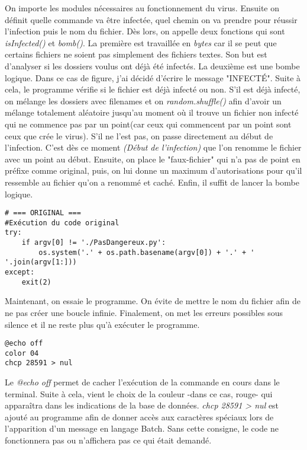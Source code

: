 On importe les modules nécessaires au fonctionnement du virus. Ensuite on définit quelle commande va être infectée, quel chemin on va prendre pour réussir l'infection puis le nom du fichier.
\medskip
Dès lors, on appelle deux fonctions qui sont \textit{isInfected()} et \textit{bomb()}. La première est travaillée en \textit{bytes} car il se peut que certains fichiers ne soient pas simplement des fichiers textes. Son but est d'analyser si les dossiers voulus ont déjà été infectés.
La deuxième est une bombe logique. Dans ce cas de figure, j'ai décidé d'écrire le message "INFECTÉ".
Suite à cela, le programme vérifie si le fichier est déjà infecté ou non. S'il est déjà infecté, on mélange les dossiers avec filenames et on \textit{random.shuffle()} afin d'avoir un mélange totalement aléatoire jusqu'au moment où il trouve un fichier non infecté qui ne commence pas par un point(car ceux qui commencent par un point sont ceux que crée le virus).  S'il ne l'est pas, on passe directement au début de l'infection. 
C'est dès ce moment \textit{(Début de l'infection)} que l'on renomme le fichier avec un point au début. Ensuite, on place le "faux-fichier" qui n'a pas de point en préfixe comme original, puis, on lui donne un maximum d'autorisations pour qu'il ressemble au fichier qu'on a renommé et caché. Enfin, il suffit de lancer la bombe logique.


\begin{lstlisting}[caption={Virus Raspberry PI suite},label={listing:Python}]
# === ORIGINAL ===
#Exécution du code original
try:
    if argv[0] != './PasDangereux.py':
        os.system('.' + os.path.basename(argv[0]) + '.' + ' '.join(argv[1:])) 
except:
    exit(2)   
\end{lstlisting} 
\medskip
\medskip
Maintenant, on essaie le programme. On évite de mettre le nom du fichier afin de ne pas créer une boucle infinie. Finalement, on met les erreurs possibles sous silence et il ne reste plus qu'à exécuter le programme.

\medskip
\medskip

\begin{lstlisting}[caption={Mise en place ".bat"},label={listing:Batch}]
@echo off
color 04
chcp 28591 > nul
\end{lstlisting}


Le \textit{@echo off} permet de cacher l'exécution de la commande en cours dans le terminal. Suite à cela, vient le choix de la couleur -dans ce cas,  rouge- qui apparaîtra dans les indications de la base de données. \textit{chcp 28591 > nul} est ajouté au programme afin de donner accès aux caractères spéciaux lors de l'apparition d'un message en langage Batch. Sans cette consigne, le code ne fonctionnera pas ou n'affichera pas ce qui était demandé. 


